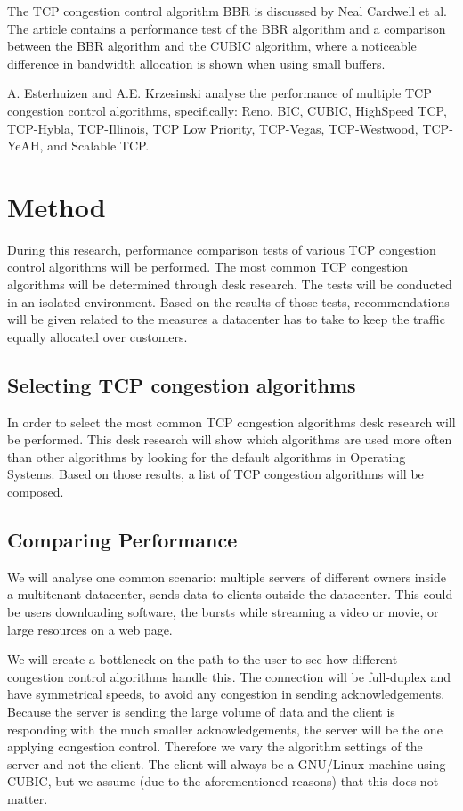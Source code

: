 \documentclass{article}
\begin{document}
The TCP congestion control algorithm BBR is discussed by Neal Cardwell et
al.\cite{bbr-congestion} The article contains a performance test of the BBR
algorithm and a comparison between the BBR algorithm and the CUBIC algorithm,
where a noticeable difference in bandwidth allocation is shown when using small
buffers.

A. Esterhuizen and A.E. Krzesinski\cite{multiple-congestion} analyse the
performance of multiple TCP congestion control algorithms, specifically: Reno,
BIC, CUBIC, HighSpeed TCP, TCP-Hybla, TCP-Illinois, TCP Low Priority,
TCP-Vegas, TCP-Westwood, TCP-YeAH, and Scalable TCP.


\section{Method}\label{sec:method}

During this research, performance comparison tests of various TCP congestion
control algorithms will be performed. The most common TCP congestion algorithms will be
determined through desk research. The tests will be conducted in an isolated
environment. Based on the results of those tests, recommendations will be given
related to the measures a datacenter has to take to keep the traffic equally
allocated over customers.


\subsection{Selecting TCP congestion algorithms}

In order to select the most common TCP congestion algorithms desk research will
be performed. This desk research will show which algorithms are used more often
than other algorithms by looking for the default algorithms in Operating
Systems. Based on those results, a list of TCP congestion algorithms will be
composed.


\subsection{Comparing Performance}

We will analyse one common scenario: multiple servers of different owners
inside a multitenant datacenter, sends data to clients outside the datacenter.
This could be users downloading software, the bursts while streaming a video
or movie, or large resources on a web page.

We will create a bottleneck on the path to the user to see how different
congestion control algorithms handle this. The connection will be full-duplex
and have symmetrical speeds, to avoid any congestion in sending
acknowledgements. Because the server is sending the large volume of data and
the client is responding with the much smaller acknowledgements, the server
will be the one applying congestion control. Therefore we vary the algorithm
settings of the server and not the client. The client will always be a
GNU/Linux machine using CUBIC, but we assume (due to the aforementioned
reasons) that this does not matter.
\end{document}
